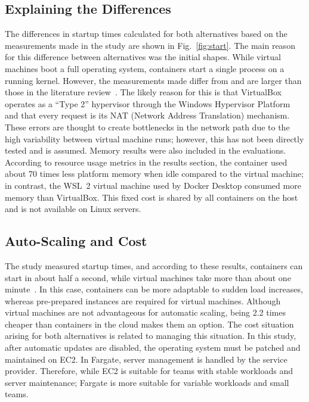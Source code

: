\documentclass[conference,a4paper]{IEEEtran}
\begin{document}
\subsection{Explaining the Differences}
The differences in startup times calculated for both alternatives based on the measurements made in the study are shown in Fig.~\ref{fig:start}. The main reason for this difference between alternatives was the initial shapes. While virtual machines boot a full operating system, containers start a single process on a running kernel. However, the measurements made differ from and are larger than those in the literature review~\cite{b6,b7}. The likely reason for this is that VirtualBox operates as a ``Type 2'' hypervisor through the Windows Hypervisor Platform and that every request is its NAT (Network Address Translation) mechanism. These errors are thought to create bottlenecks in the network path due to the high variability between virtual machine runs; however, this has not been directly tested and is assumed. Memory results were also included in the evaluations. According to resource usage metrics in the results section, the container used about 70 times less platform memory when idle compared to the virtual machine; in contrast, the WSL~2 virtual machine used by Docker Desktop consumed more memory than VirtualBox. This fixed cost is shared by all containers on the host and is not available on Linux servers.

\subsection{Auto-Scaling and Cost}
The study measured startup times, and according to these results, containers can start in about half a second, while virtual machines take more than about one minute~\cite{b1}. In this case, containers can be more adaptable to sudden load increases, whereas pre-prepared instances are required for virtual machines. Although virtual machines are not advantageous for automatic scaling, being 2.2 times cheaper than containers in the cloud makes them an option. The cost situation arising for both alternatives is related to managing this situation. In this study, after automatic updates are disabled, the operating system must be patched and maintained on EC2. In Fargate, server management is handled by the service provider. Therefore, while EC2 is suitable for teams with stable workloads and server maintenance; Fargate is more suitable for variable workloads and small teams.
\end{document}

